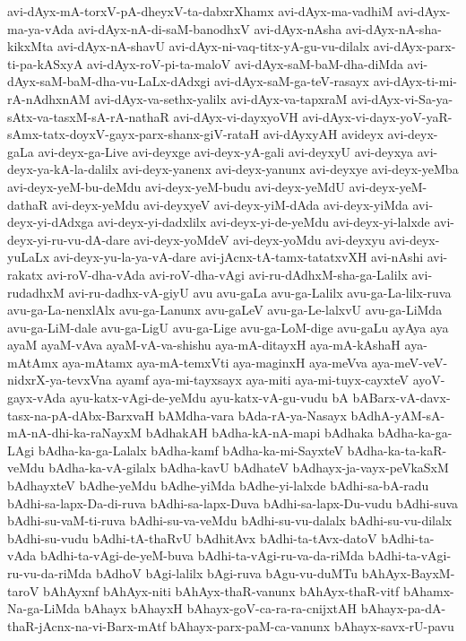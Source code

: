 {avi-dAyx-mA-torxV-pA-dheyxV-ta-dabxrXhamx
avi-dAyx-ma-vadhiM
avi-dAyx-ma-ya-vAda
avi-dAyx-nA-di-saM-banodhxV
avi-dAyx-nAsha
avi-dAyx-nA-sha-kikxMta
avi-dAyx-nA-shavU
avi-dAyx-ni-vaq-titx-yA-gu-vu-dilalx
avi-dAyx-parx-ti-pa-kASxyA
avi-dAyx-roV-pi-ta-maloV
avi-dAyx-saM-baM-dha-diMda
avi-dAyx-saM-baM-dha-vu-LaLx-dAdxgi
avi-dAyx-saM-ga-teV-rasayx
avi-dAyx-ti-mi-rA-nAdhxnAM
avi-dAyx-va-sethx-yalilx
avi-dAyx-va-tapxraM
avi-dAyx-vi-Sa-ya-sAtx-va-tasxM-sA-rA-nathaR
avi-dAyx-vi-dayxyoVH
avi-dAyx-vi-dayx-yoV-yaR-sAmx-tatx-doyxV-gayx-parx-shanx-giV-rataH
avi-dAyxyAH
avideyx
avi-deyx-gaLa
avi-deyx-ga-Live
avi-deyxge
avi-deyx-yA-gali
avi-deyxyU
avi-deyxya
avi-deyx-ya-kA-la-dalilx
avi-deyx-yanenx
avi-deyx-yanunx
avi-deyxye
avi-deyx-yeMba
avi-deyx-yeM-bu-deMdu
avi-deyx-yeM-budu
avi-deyx-yeMdU
avi-deyx-yeM-dathaR
avi-deyx-yeMdu
avi-deyxyeV
avi-deyx-yiM-dAda
avi-deyx-yiMda
avi-deyx-yi-dAdxga
avi-deyx-yi-dadxlilx
avi-deyx-yi-de-yeMdu
avi-deyx-yi-lalxde
avi-deyx-yi-ru-vu-dA-dare
avi-deyx-yoMdeV
avi-deyx-yoMdu
avi-deyxyu
avi-deyx-yuLaLx
avi-deyx-yu-la-ya-vA-dare
avi-jAcnx-tA-tamx-tatatxvXH
avi-nAshi
avi-rakatx
avi-roV-dha-vAda
avi-roV-dha-vAgi
avi-ru-dAdhxM-sha-ga-Lalilx
avi-rudadhxM
avi-ru-dadhx-vA-giyU
avu
avu-gaLa
avu-ga-Lalilx
avu-ga-La-lilx-ruva
avu-ga-La-nenxlAlx
avu-ga-Lanunx
avu-gaLeV
avu-ga-Le-lalxvU
avu-ga-LiMda
avu-ga-LiM-dale
avu-ga-LigU
avu-ga-Lige
avu-ga-LoM-dige
avu-gaLu
ayAya
aya
ayaM
ayaM-vAva
ayaM-vA-va-shishu
aya-mA-ditayxH
aya-mA-kAshaH
aya-mAtAmx
aya-mAtamx
aya-mA-temxVti
aya-maginxH
aya-meVva
aya-meV-veV-nidxrX-ya-tevxVna
ayamf
aya-mi-tayxsayx
aya-miti
aya-mi-tuyx-cayxteV
ayoV-gayx-vAda
ayu-katx-vAgi-de-yeMdu
ayu-katx-vA-gu-vudu
bA
bABarx-vA-davx-tasx-na-pA-dAbx-BarxvaH
bAMdha-vara
bAda-rA-ya-Nasayx
bAdhA-yAM-sA-mA-nA-dhi-ka-raNayxM
bAdhakAH
bAdha-kA-nA-mapi
bAdhaka
bAdha-ka-ga-LAgi
bAdha-ka-ga-Lalalx
bAdha-kamf
bAdha-ka-mi-SayxteV
bAdha-ka-ta-kaR-veMdu
bAdha-ka-vA-gilalx
bAdha-kavU
bAdhateV
bAdhayx-ja-vayx-peVkaSxM
bAdhayxteV
bAdhe-yeMdu
bAdhe-yiMda
bAdhe-yi-lalxde
bAdhi-sa-bA-radu
bAdhi-sa-lapx-Da-di-ruva
bAdhi-sa-lapx-Duva
bAdhi-sa-lapx-Du-vudu
bAdhi-suva
bAdhi-su-vaM-ti-ruva
bAdhi-su-va-veMdu
bAdhi-su-vu-dalalx
bAdhi-su-vu-dilalx
bAdhi-su-vudu
bAdhi-tA-thaRvU
bAdhitAvx
bAdhi-ta-tAvx-datoV
bAdhi-ta-vAda
bAdhi-ta-vAgi-de-yeM-buva
bAdhi-ta-vAgi-ru-va-da-riMda
bAdhi-ta-vAgi-ru-vu-da-riMda
bAdhoV
bAgi-lalilx
bAgi-ruva
bAgu-vu-duMTu
bAhAyx-BayxM-taroV
bAhAyxnf
bAhAyx-niti
bAhAyx-thaR-vanunx
bAhAyx-thaR-vitf
bAhamx-Na-ga-LiMda
bAhayx
bAhayxH
bAhayx-goV-ca-ra-ra-cnijxtAH
bAhayx-pa-dA-thaR-jAcnx-na-vi-Barx-mAtf
bAhayx-parx-paM-ca-vanunx
bAhayx-savx-rU-pavu
}
